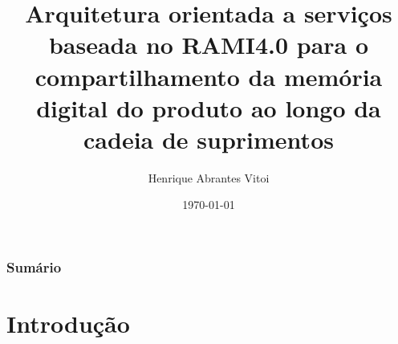 \documentclass[10pt]{beamer}
\title{Arquitetura orientada a servi\c{c}os baseada no RAMI4.0 para o compartilhamento da mem\'{o}ria digital do produto ao longo da cadeia de suprimentos} %
\author{Henrique Abrantes Vitoi} %
\institute[Poli-USP] %
{
Escola Politécnica da Universidade de São Paulo \\
Engenharia de Controle e Automação Mecânica

\medskip


\textit{Orientação}: Prof. Dr. Fabrício Junqueira

\textit{Coorientação}: Prof. Dr. Paulo Eigi Miyagi
}
\date{\today} %
\begin{document}
	

\begin{frame}
	\titlepage %
\end{frame}

\begin{frame}
	\frametitle{Sumário} %
	\tableofcontents %
\end{frame}

\section{Introdução}
\end{document}
